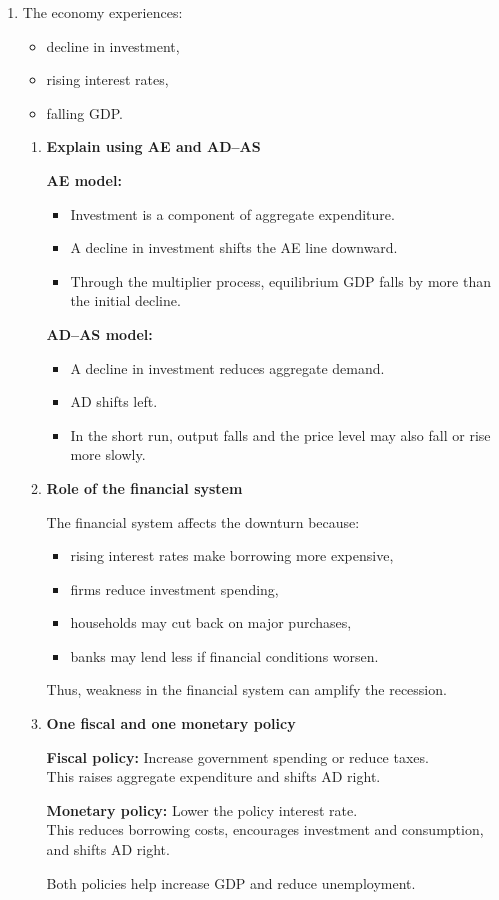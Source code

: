 \documentclass[12pt]{article}
\begin{document}
\begin{enumerate}[label=\textbf{\arabic*.}, start=18]

\item The economy experiences:
\begin{itemize}
    \item decline in investment,
    \item rising interest rates,
    \item falling GDP.
\end{itemize}

\begin{enumerate}
    \item[(a)] \textbf{Explain using AE and AD--AS}

\textbf{AE model:}
\begin{itemize}
    \item Investment is a component of aggregate expenditure.
    \item A decline in investment shifts the AE line downward.
    \item Through the multiplier process, equilibrium GDP falls by more than the initial decline.
\end{itemize}

\textbf{AD--AS model:}
\begin{itemize}
    \item A decline in investment reduces aggregate demand.
    \item AD shifts left.
    \item In the short run, output falls and the price level may also fall or rise more slowly.
\end{itemize}

\item[(b)] \textbf{Role of the financial system}

The financial system affects the downturn because:
\begin{itemize}
    \item rising interest rates make borrowing more expensive,
    \item firms reduce investment spending,
    \item households may cut back on major purchases,
    \item banks may lend less if financial conditions worsen.
\end{itemize}

Thus, weakness in the financial system can amplify the recession.

\item[(c)] \textbf{One fiscal and one monetary policy}

\textbf{Fiscal policy:} Increase government spending or reduce taxes.\\
This raises aggregate expenditure and shifts AD right.

\textbf{Monetary policy:} Lower the policy interest rate.\\
This reduces borrowing costs, encourages investment and consumption, and shifts AD right.

Both policies help increase GDP and reduce unemployment.
\end{enumerate}

\end{enumerate}
\end{document}
